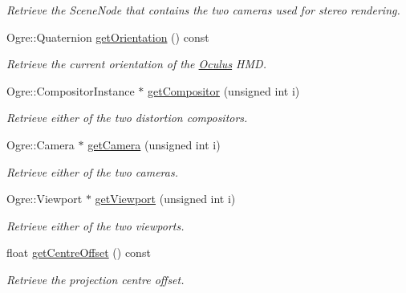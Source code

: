 \begin{DoxyCompactItemize}
\begin{DoxyCompactList}\small\item\em \-Retrieve the \-Scene\-Node that contains the two cameras used for stereo rendering. \end{DoxyCompactList}\item 
\hypertarget{classOculus_aaa0656d504cf27b360e17aeb64e084b1}{\-Ogre\-::\-Quaternion \hyperlink{classOculus_aaa0656d504cf27b360e17aeb64e084b1}{get\-Orientation} () const }\label{classOculus_aaa0656d504cf27b360e17aeb64e084b1}

\begin{DoxyCompactList}\small\item\em \-Retrieve the current orientation of the \hyperlink{classOculus}{\-Oculus} \-H\-M\-D. \end{DoxyCompactList}\item 
\hypertarget{classOculus_af7b9faaba46ebab5832e7981f64f1ed2}{\-Ogre\-::\-Compositor\-Instance $\ast$ \hyperlink{classOculus_af7b9faaba46ebab5832e7981f64f1ed2}{get\-Compositor} (unsigned int i)}\label{classOculus_af7b9faaba46ebab5832e7981f64f1ed2}

\begin{DoxyCompactList}\small\item\em \-Retrieve either of the two distortion compositors. \end{DoxyCompactList}\item 
\hypertarget{classOculus_afc5ba0805fa77f79274ae02459a79f8e}{\-Ogre\-::\-Camera $\ast$ \hyperlink{classOculus_afc5ba0805fa77f79274ae02459a79f8e}{get\-Camera} (unsigned int i)}\label{classOculus_afc5ba0805fa77f79274ae02459a79f8e}

\begin{DoxyCompactList}\small\item\em \-Retrieve either of the two cameras. \end{DoxyCompactList}\item 
\hypertarget{classOculus_a43bb7c57f4a2f18ac068490920429c5e}{\-Ogre\-::\-Viewport $\ast$ \hyperlink{classOculus_a43bb7c57f4a2f18ac068490920429c5e}{get\-Viewport} (unsigned int i)}\label{classOculus_a43bb7c57f4a2f18ac068490920429c5e}

\begin{DoxyCompactList}\small\item\em \-Retrieve either of the two viewports. \end{DoxyCompactList}\item 
\hypertarget{classOculus_a9c65adc0a6cc2e033dea0106919b88d6}{float \hyperlink{classOculus_a9c65adc0a6cc2e033dea0106919b88d6}{get\-Centre\-Offset} () const }\label{classOculus_a9c65adc0a6cc2e033dea0106919b88d6}

\begin{DoxyCompactList}\small\item\em \-Retrieve the projection centre offset. \end{DoxyCompactList}\end{DoxyCompactItemize}
